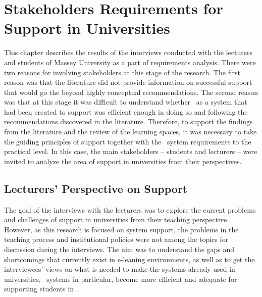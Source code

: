 \chapter{Stakeholders Requirements for \LLLc Support in Universities
\label{cha:model}}
This chapter describes the results of the interviews conducted with the
lecturers and students of Massey University as a part of \LLLs requirements
analysis. There were two reasons for involving stakeholders at this stage of the
research. The first reason was that the literature did not provide information
on successful \LLLs support that would go the beyond highly conceptual
recommendations. The second reason was that at this stage it was difficult to
understand whether \ep~as a system that had been created to support \LLLs was
efficient enough in doing so and following the recommendations discovered in the
literature. Therefore, to support the findings from the literature and the
review of the learning spaces, it was necessary to take the guiding principles
of \LLLs support together with the \ep~system requirements to the practical
level. In this case, the main stakeholders -- students and lecturers -- were
invited to analyze the area of \LLLs support in universities from their
perspectives.

\section{Lecturers' Perspective on \LLLc Support}

The goal of the interviews with the lecturers was to explore the current
problems and challenges of \LLLs support in universities from their teaching
perspective. However, as this research is focused on system support, the
problems in the teaching process and institutional policies were not among the
topics for discussion during the interviews. The aim was to understand the gaps
and shortcomings that currently exist in e-leaning environments, as well as to
get the interviewees' views on what is needed to make the systems already used
in universities, \ep~systems in particular, become more efficient and adequate
for supporting students in \LLLsn. 

